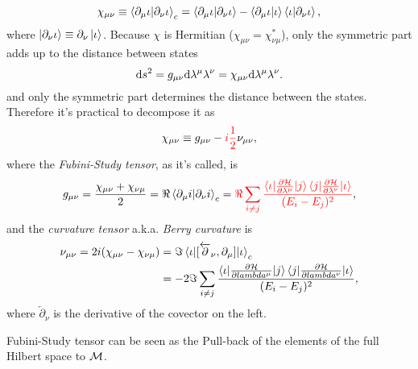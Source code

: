 \begin{equation}
    \chi_{\mu\nu}\equiv \braket{\partial_\mu \iota|\partial_\nu \iota}_c = \braket{\partial_\mu \iota|\partial_\nu \iota} - \braket{\partial_\mu \iota|\iota}\braket{\iota|\partial_\nu \iota},
\end{equation}
where $\ket{\partial_\nu \iota}\equiv\partial_\nu \ket{ \iota}$. Because $\chi$ is Hermitian ($\chi_{\mu\nu}=\chi^*_{\nu\mu}$), only the symmetric part adds up to the distance between states 
\begin{equation}
    \mathrm{d} s^2= g_{\mu\nu}\mathrm{d} \lambda^\mu \lambda^\nu= \chi_{\mu\nu}\mathrm{d} \lambda^\mu \lambda^\nu.
\end{equation}
 and only the symmetric part determines the distance between the states. Therefore it's practical to decompose it as
\begin{equation}
    \chi_{\mu\nu} \equiv g_{\mu\nu} - \textcolor{red}{i\frac{1}{2}} \nu_{\mu\nu},
\end{equation}
where the \emph{Fubini-Study tensor}, as it's called, is
\begin{equation}
    g_{\mu\nu} = \frac{\chi_{\mu\nu}+\chi_{\nu\mu}}{2} = \Re\braket{\partial_\mu i|\partial_\nu i}_c = \textcolor{red}{\Re \sum_{i\neq j}\frac{\braket{\iota|\frac{\partial \mathcal{H}}{\partial \lambda^\mu}|j}\braket{j|\frac{\partial \mathcal{H}}{\partial \lambda^\nu}|\iota}}{(E_i-E_j)^2}},
    \label{eq:geom.tensorREdefinition}
\end{equation}
and the \emph{curvature tensor} a.k.a. \emph{Berry curvature} is
\begin{equation}
    \begin{split}
        \nu_{\mu\nu} = 2 i(\chi_{\mu\nu}-\chi_{\nu\mu})&= \Im\braket{\iota|[\overleftarrow{\partial}_\nu,\partial_\mu]|\iota}_c \\
        &= -2 \Im \sum_{i\neq j}\frac{\braket{\iota|\frac{\partial \mathcal{H}}{\partial lambda^\mu}|j}\braket{j|\frac{\partial \mathcal{H}}{\partial lambda^\nu}|\iota}}{(E_i-E_j)^2},
    \end{split}
\end{equation}
where $\overleftarrow{\partial}_\nu$ is the derivative of the covector on the left.

Fubini-Study tensor can be seen as the Pull-back of the elements of the full Hilbert space to $\mathcal{M}$. 


